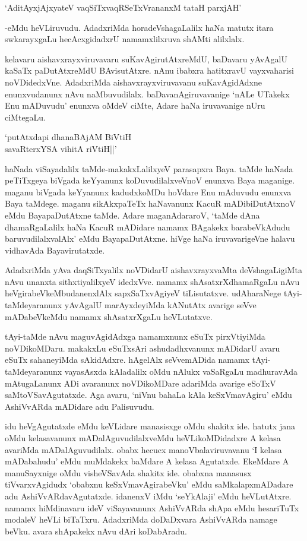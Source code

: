 \begin{shloka}
`AditAyxjAjxyateV vaqSiTxvaqRSeTxVrananxM tataH parxjAH'
\end{shloka}

-eMdu heVLiruvudu. AdadxriMda horadeVshagaLalilx haNa matutx itara swkarayxgaLu hecAcxgidadxrU namamxlilxruva shAMti alilxlalx.

kelavaru aishavxrayxviruvavaru suKavAgirutAtxreMdU, baDavaru yAvAgalU kaSaTx paDutAtxreMdU BAvisutAtxre. nAnu ibabxra hatitxravU vayxvaharisi noVDidedxVne. AdadxriMda aishavxrayxviruvavanu suKavAgidAdxne enunxvudanunx nAvu naMbuvudilalx. baDavanAgiruvavanige `nALe UTakekx Enu mADuvudu' enunxva oMdeV ciMte, Adare haNa iruvavanige nUru ciMtegaLu.

\begin{shloka}
`putAtxdapi dhanaBAjAM BiVtiH\\
savaRterxYSA vihitA riVtiH||'
\end{shloka}

haNada viSayadalilx taMde-makakxLalilxyeV parasapxra Baya. taMde haNada peTiTxgeya biVgada keYyanunx koDuvudilalxveVnoV enunxva Baya maganige. maganu biVgada keYyanunx kadudxkoMDu hoVdare Enu mAduvudu enunxva Baya taMdege. maganu sikAkxpaTeTx haNavanunx KacuR mADibiDutAtxnoV eMdu BayapaDutAtxne taMde. Adare maganAdararoV, `taMde dAna dhamaRgaLalilx haNa KacuR mADidare namamx BAgakekx barabeVkAdudu baruvudilalxvalAlx' eMdu BayapaDutAtxne. hiVge haNa iruvavarigeVne halavu vidhavAda Bayavirutatxde.

AdadxriMda yAva daqSiTxyalilx noVDidarU aishavxrayxvaMta deVshagaLigiMta nAvu unanxta sithxtiyalilxyeV idedxVve. namamx shAsatxrXdhamaRgaLu nAvu heVgirabeVkeMbudanenxlAlx sapxSaTxvAgiyeV tiLisutatxve. udAharaNege tAyi-taMdeyaranunx yAvAgalU marAyxdeyiMda kANutAtx avarige seVve mADabeVkeMdu namamx shAsatxrXgaLu heVLutatxve.

tAyi-taMde nAvu maguvAgidAdxga namamxnunx eSuTx pirxVtiyiMda noVDikoMDaru. makakxLu eSuTxsAri ashudadhxvanunx mADidarU avaru eSuTx sahaneyiMda sAkidAdxre. hAgelAlx seVvemADida namamx tAyi-taMdeyaranunx vayasAsxda kAladalilx oMdu nAlukx vaSaRgaLu madhuravAda mAtugaLanunx ADi avaranunx noVDikoMDare adariMda avarige eSoTxV saMtoVSavAgutatxde. Aga avaru, `niVnu bahaLa kAla keSxVmavAgiru' eMdu AshiVvARda mADidare adu Palisuvudu.

idu heVgAgutatxde eMdu keVLidare manasisxge oMdu shakitx ide. hatutx jana oMdu kelasavanunx mADalAguvudilalxveMdu heVLikoMDidadxre A kelasa avariMda mADalAguvudilalx. obabx hecucx manoVbalaviruvavanu `I kelasa mADabahudu' eMdu muMdakekx baMdare A kelasa Agutatxde. EkeMdare A manuSayxnige oMdu visheVSavAda shakitx ide. obabxna manasusx tiVvarxvAgidudx `obabxnu keSxVmavAgirabeVku' eMdu saMkalapxmADadare adu AshiVvARdavAgutatxde. idanenxV iMdu `seYkAlaji' eMdu heVLutAtxre. namamx hiMdinavaru ideV viSayavanunx AshiVvARda shApa eMdu hesariTuTx modaleV heVLi biTaTxru. AdadxriMda doDaDxvara AshiVvARda namage beVku. avara shApakekx nAvu dAri koDabAradu.

